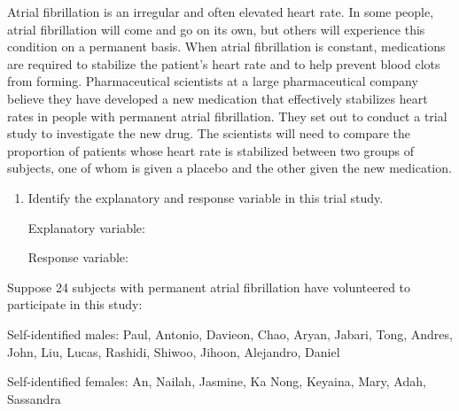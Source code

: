 \documentclass[
]{report}
\begin{document}
Atrial fibrillation is an irregular and often elevated heart rate. In some people, atrial fibrillation will come and go on its own, but others will experience this condition on a permanent basis. When atrial fibrillation is constant, medications are required to stabilize the patient's heart rate and to help prevent blood clots from forming. Pharmaceutical scientists at a large pharmaceutical company believe they have developed a new medication that effectively stabilizes heart rates in people with permanent atrial fibrillation. They set out to conduct a trial study to investigate the new drug. The scientists will need to compare the proportion of patients whose heart rate is stabilized between two groups of subjects, one of whom is given a placebo and the other given the new medication.

\begin{enumerate}
\def\labelenumi{\arabic{enumi}.}
\setcounter{enumi}{2}
\item
  Identify the explanatory and response variable in this trial study.

  Explanatory variable:
  \vspace{0.5in}

  Response variable:
  \vspace{0.5in}
\end{enumerate}

\newpage

Suppose 24 subjects with permanent atrial fibrillation have volunteered to participate in this study:

Self-identified males: Paul, Antonio, Davieon, Chao, Aryan, Jabari, Tong, Andres, John, Liu, Lucas, Rashidi, Shiwoo, Jihoon, Alejandro, Daniel

Self-identified females: An, Nailah, Jasmine, Ka Nong, Keyaina, Mary, Adah, Sassandra
\end{document}
